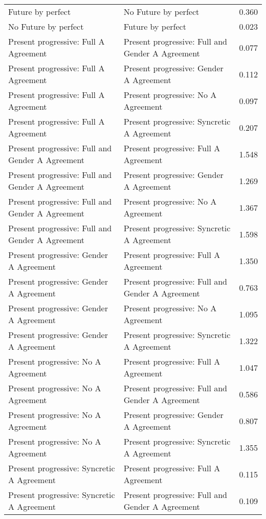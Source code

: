 \begin{longtable}{p{.4\linewidth}p{.4\linewidth}p{.1\linewidth}}
Future by perfect & No Future by perfect & 0.360\\
No Future by perfect & Future by perfect & 0.023\\
Present progressive: Full A Agreement & Present progressive: Full and Gender A Agreement & 0.077\\
Present progressive: Full A Agreement & Present progressive: Gender A Agreement & 0.112\\
Present progressive: Full A Agreement & Present progressive: No A Agreement & 0.097\\
Present progressive: Full A Agreement & Present progressive: Syncretic A Agreement & 0.207\\
Present progressive: Full and Gender A Agreement & Present progressive: Full A Agreement & 1.548\\
Present progressive: Full and Gender A Agreement & Present progressive: Gender A Agreement & 1.269\\
Present progressive: Full and Gender A Agreement & Present progressive: No A Agreement & 1.367\\
Present progressive: Full and Gender A Agreement & Present progressive: Syncretic A Agreement & 1.598\\
Present progressive: Gender A Agreement & Present progressive: Full A Agreement & 1.350\\
Present progressive: Gender A Agreement & Present progressive: Full and Gender A Agreement & 0.763\\
Present progressive: Gender A Agreement & Present progressive: No A Agreement & 1.095\\
Present progressive: Gender A Agreement & Present progressive: Syncretic A Agreement & 1.322\\
Present progressive: No A Agreement & Present progressive: Full A Agreement & 1.047\\
Present progressive: No A Agreement & Present progressive: Full and Gender A Agreement & 0.586\\
Present progressive: No A Agreement & Present progressive: Gender A Agreement & 0.807\\
Present progressive: No A Agreement & Present progressive: Syncretic A Agreement & 1.355\\
Present progressive: Syncretic A Agreement & Present progressive: Full A Agreement & 0.115\\
Present progressive: Syncretic A Agreement & Present progressive: Full and Gender A Agreement & 0.109\\

\end{longtable}
